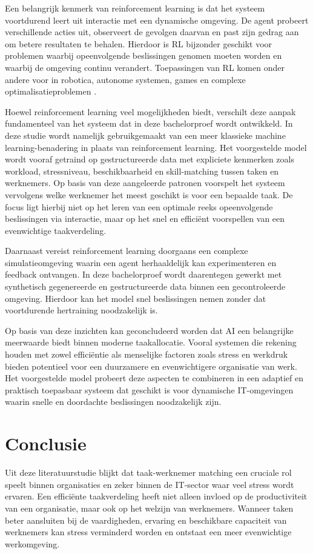 Een belangrijk kenmerk van reinforcement learning is dat het systeem voortdurend leert uit interactie met een dynamische omgeving. De agent probeert verschillende acties uit, observeert de gevolgen daarvan en past zijn gedrag aan om betere resultaten te behalen. Hierdoor is RL bijzonder geschikt voor problemen waarbij opeenvolgende beslissingen genomen moeten worden en waarbij de omgeving continu verandert. Toepassingen van RL komen onder andere voor in robotica, autonome systemen, games en complexe optimalisatieproblemen \autocite{Tonazzo}.

\vspace{1em}Hoewel reinforcement learning veel mogelijkheden biedt, verschilt deze aanpak fundamenteel van het systeem dat in deze bachelorproef wordt ontwikkeld. In deze studie wordt namelijk gebruikgemaakt van een meer klassieke machine learning-benadering in plaats van reinforcement learning. Het voorgestelde model wordt vooraf getraind op gestructureerde data met expliciete kenmerken zoals workload, stressniveau, beschikbaarheid en skill-matching tussen taken en werknemers. Op basis van deze aangeleerde patronen voorspelt het systeem vervolgens welke werknemer het meest geschikt is voor een bepaalde taak. De focus ligt hierbij niet op het leren van een optimale reeks opeenvolgende beslissingen via interactie, maar op het snel en efficiënt voorspellen van een evenwichtige taakverdeling.

Daarnaast vereist reinforcement learning doorgaans een complexe simulatieomgeving waarin een agent herhaaldelijk kan experimenteren en feedback ontvangen. In deze bachelorproef wordt daarentegen gewerkt met synthetisch gegenereerde en gestructureerde data binnen een gecontroleerde omgeving. Hierdoor kan het model snel beslissingen nemen zonder dat voortdurende hertraining noodzakelijk is.

\vspace{1em}Op basis van deze inzichten kan geconcludeerd worden dat AI een belangrijke meerwaarde biedt binnen moderne taakallocatie. Vooral systemen die rekening houden met zowel efficiëntie als menselijke factoren zoals stress en werkdruk bieden potentieel voor een duurzamere en evenwichtigere organisatie van werk. Het voorgestelde model probeert deze aspecten te combineren in een adaptief en praktisch toepasbaar systeem dat geschikt is voor dynamische IT-omgevingen waarin snelle en doordachte beslissingen noodzakelijk zijn.

\section{Conclusie}
\label{ch:conclusie-literatuurstudie}
Uit deze literatuurstudie blijkt dat taak-werknemer matching een cruciale rol speelt binnen organisaties en zeker binnen de IT-sector waar veel stress wordt ervaren. Een efficiënte taakverdeling heeft niet alleen invloed op de productiviteit van een organisatie, maar ook op het welzijn van werknemers. Wanneer taken beter aansluiten bij de vaardigheden, ervaring en beschikbare capaciteit van werknemers kan stress verminderd worden en ontstaat een meer evenwichtige werkomgeving.

